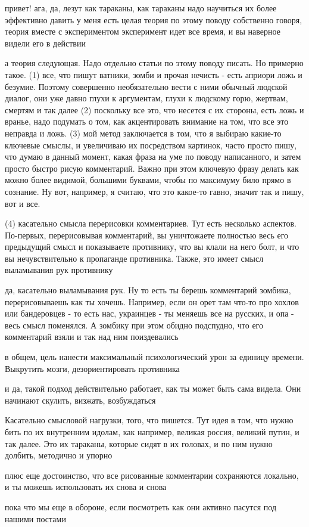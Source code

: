  
 
 
 
 

привет! ага, да, лезут как тараканы, как тараканы
надо научиться их более эффективно давить
у меня есть целая теория по этому поводу
собственно говоря, теория вместе с экспериментом
эксперимент идет все время, и вы наверное видели его в действии

а теория следующая. Надо отдельно статьи по этому поводу писать. Но примерно
такое. (1) все, что пишут ватники, зомби и прочая нечисть - есть априори ложь и
безумие. Поэтому совершенно необязательно вести с ними обычный людской диалог,
они уже давно глухи к аргументам, глухи к людскому горю, жертвам, смертям и так
далее (2) поскольку все это, что несется с их стороны, есть ложь и вранье, надо
подумать о том, как акцентировать внимание на том, что все это неправда и ложь.
(3) мой метод заключается в том, что я выбираю какие-то ключевые смыслы, и
увеличиваю их посредством картинок, часто просто пишу, что думаю в данный
момент, какая фраза на уме по поводу написанного, и затем просто быстро рисую
комментарий. Важно при этом ключевую фразу делать как можно более видимой,
большими буквами, чтобы по максимуму било прямо в сознание. Ну вот, например, я
считаю, что это какое-то гавно, значит так и пишу, вот и все.

(4) касательно смысла перерисовки комментариев. Тут есть несколько аспектов.
По-первых, перерисовывая комментарий, вы уничтожаете полностью весь его
предыдущий смысл и показываете противнику, что вы клали на него болт, и что вы
нечувствительно к пропаганде противника. Также, это имеет смысл выламывания рук
противнику

да, касательно выламывания рук. Ну то есть ты берешь комментарий зомбика,
перерисовываешь как ты хочешь. Например, если он орет там что-то про хохлов или
бандеровцев - то есть нас, украинцев - ты меняешь все на русских, и опа - весь
смысл поменялся. А зомбику при этом обидно подспудно, что его комментарий взяли
и так над ним поиздевались

в общем, цель нанести максимальный психологический урон за единицу времени.
Выкрутить мозги, дезориентировать противника

и да, такой подход действительно работает, как ты может быть сама видела. Они
начинают скулить, визжать, возбуждаться

Касательно смысловой нагрузки, того, что пишется. Тут идея в том, что нужно
бить по их внутренним идолам, как например, великая россия, великий путин, и
так далее. Это их тараканы, которые сидят в их головах, и по ним нужно долбить,
методично и упорно

плюс еще достоинство, что все рисованные комментарии сохраняются локально, и ты
можешь использовать их снова и снова

пока что мы еще в обороне, если посмотреть как они активно пасутся под нашими
постами

